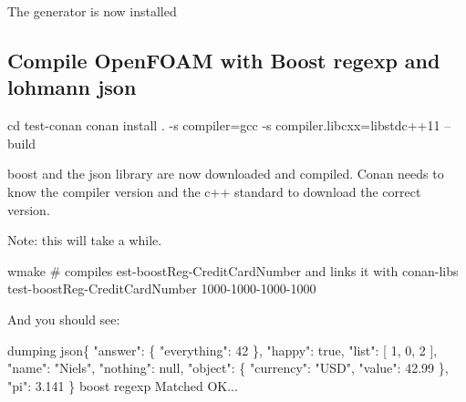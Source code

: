 The generator is now installed

\subsection*{Compile Open\+F\+O\+AM with Boost regexp and lohmann json}


\begin{DoxyCode}
cd test-conan
conan install . -s compiler=gcc -s compiler.libcxx=libstdc++11 --build
\end{DoxyCode}


boost and the json library are now downloaded and compiled. Conan needs to know the compiler version and the c++ standard to download the correct version.

Note\+: this will take a while.


\begin{DoxyCode}
wmake # compiles est-boostReg-CreditCardNumber and links it with conan-libs
test-boostReg-CreditCardNumber 1000-1000-1000-1000 
\end{DoxyCode}


And you should see\+: 
\begin{DoxyCode}
dumping json\{
    "answer": \{
        "everything": 42
    \},
    "happy": true,
    "list": [
        1,
        0,
        2
    ],
    "name": "Niels",
    "nothing": null,
    "object": \{
        "currency": "USD",
        "value": 42.99
    \},
    "pi": 3.141
\}
boost regexp
Matched OK...
\end{DoxyCode}
 